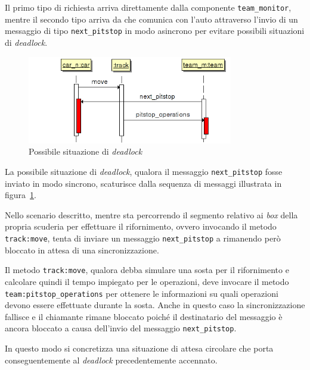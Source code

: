 Il primo tipo di richiesta arriva direttamente dalla componente \texttt{team\_monitor}, mentre il secondo tipo arriva da \team{} che comunica con l'auto attraverso l'invio di un messaggio di tipo \texttt{next\_pitstop} in modo asincrono per evitare possibili situazioni di \textit{deadlock}.

\begin{figure}
\begin{center}
\includegraphics[width=0.8\textwidth]{diagrammi/PitstopDeadlock}
\caption{Possibile situazione di \textit{deadlock}}
\label{fig:pitstopDeadlock}
\end{center}
\end{figure}

La possibile situazione di \textit{deadlock}, qualora il messaggio \texttt{next\_pitstop} fosse inviato in modo sincrono, scaturisce dalla sequenza di messaggi illustrata in figura~\ref{fig:pitstopDeadlock}.

Nello scenario descritto, mentre \car{} sta percorrendo il segmento relativo ai \textit{box} della propria scuderia per effettuare il rifornimento, ovvero invocando il metodo \texttt{track:move}, \team{} tenta di inviare un messaggio \texttt{next\_pitstop} a \car{} rimanendo però bloccato in attesa di una sincronizzazione.

Il metodo \texttt{track:move}, qualora debba simulare una sosta per il rifornimento e calcolare quindi il tempo impiegato per le operazioni, deve invocare il metodo \texttt{team:pitstop\_operations} per ottenere le informazioni su quali operazioni devono essere effettuate durante la sosta. Anche in questo caso la sincronizzazione fallisce e il chiamante rimane bloccato poiché il destinatario del messaggio è ancora bloccato a causa dell'invio del messaggio \texttt{next\_pitstop}.

In questo modo si concretizza una situazione di attesa circolare che porta conseguentemente al \textit{deadlock} precedentemente accennato.

